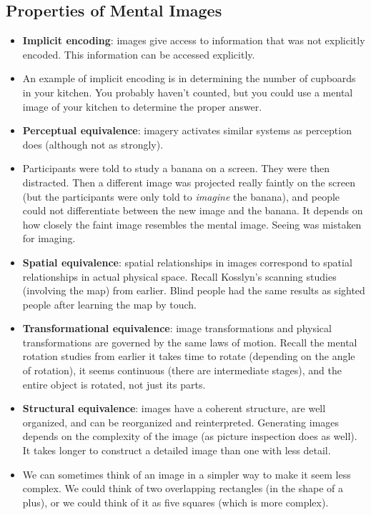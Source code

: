 \documentclass[]{article}
\newcommand{\lecture}[1]{\marginpar{{\footnotesize $\leftarrow$ \underline{#1}}}}
\begin{document}
		\subsection{Properties of Mental Images} \lecture{March 7, 2013}
			\begin{itemize}
				\item \textbf{Implicit encoding}: images give access to information that was not explicitly encoded. This information can be accessed explicitly.
				\item An example of implicit encoding is in determining the number of cupboards in your kitchen. You probably haven't counted, but you could use a mental image of your kitchen to determine the proper answer.
				\item \textbf{Perceptual equivalence}: imagery activates similar systems as perception does (although not as strongly).
				\item Participants were told to study a banana on a screen. They were then distracted. Then a different image was projected really faintly on the screen (but the participants were only told to \emph{imagine} the banana), and people could not differentiate between the new image and the banana. It depends on how closely the faint image resembles the mental image. Seeing was mistaken for imaging.
				\item \textbf{Spatial equivalence}: spatial relationships in images correspond to spatial relationships in actual physical space. Recall Kosslyn's scanning studies (involving the map) from earlier. Blind people had the same results as sighted people after learning the map by touch.
				\item \textbf{Transformational equivalence}: image transformations and physical transformations are governed by the same laws of motion. Recall the mental rotation studies from earlier \textendash{} it takes time to rotate (depending on the angle of rotation), it seems continuous (there are intermediate stages), and the entire object is rotated, not just its parts.
				\item \textbf{Structural equivalence}: images have a coherent structure, are well organized, and can be reorganized and reinterpreted. Generating images depends on the complexity of the image (as picture inspection does as well). It takes longer to construct a detailed image than one with less detail.
				\item We can sometimes think of an image in a simpler way to make it seem less complex. We could think of two overlapping rectangles (in the shape of a plus), or we could think of it as five squares (which is more complex).
			\end{itemize}
\end{document}
